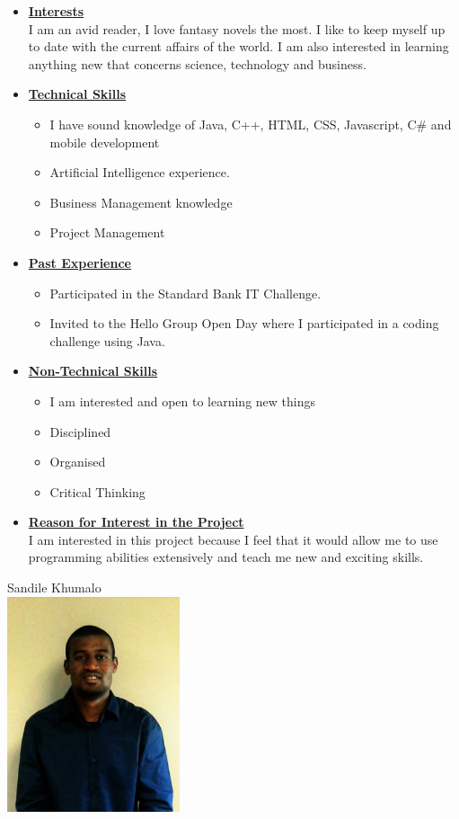 \documentclass[a4paper,12pt]{article}
\begin{document}
\begin{itemize}
\item {\large \underline{\textbf{Interests}}}\\[0.2cm]
I am an avid reader, I love fantasy novels the most. I like to keep myself up to date with the current affairs of the world. I am also interested in learning anything new that concerns science, technology and business.
\\
\item {\large \underline{\textbf{Technical Skills}}}
	\begin{itemize}
		\item I have sound knowledge of Java, C++, HTML, CSS, Javascript, C\# and mobile development 
		\item Artificial Intelligence experience.
		\item Business Management knowledge
		\item Project Management
	\end{itemize}
\bigskip
\item {\large \underline{\textbf{Past Experience}}}
\begin{itemize}
\item Participated in the Standard Bank IT Challenge.
\item Invited to the Hello Group Open Day where I participated in a coding challenge using Java.
\end{itemize}
\bigskip
\item {\large \underline{\textbf{Non-Technical Skills}}}
\begin{itemize}
\item I am interested and open to learning new things
\item Disciplined
\item Organised
\item Critical Thinking
\end{itemize}
\bigskip
\item {\large \underline{\textbf{Reason for Interest in the Project}}}\\[0.2cm]
I am interested in this project because I feel that it would allow me to use programming abilities extensively and teach me new and exciting skills.

\newpage
\end{itemize}
\begin{center}
{\Large Sandile {Khumalo}} \\[0.3cm]
\includegraphics[width=2in]{Sandile.jpg}\\[0.4cm] 
\end{center}
\end{document}

